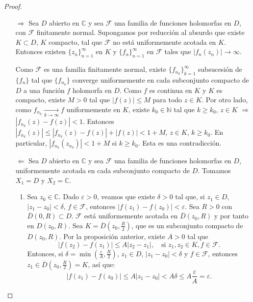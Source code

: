 \begin{proof}
    \hfill
    \begin{itemize}
        \item[$\boxed{\Rightarrow}$] Sea $D$ abierto en $\mathbb{C}$ y sea $\mathcal{F}$ una familia de funciones holomorfas en $D$, con $\mathcal{F}$ finitamente normal.
              Supongamos por reducción al absurdo que existe $K \subset D$, $K$ compacto, tal que $\mathcal{F}$ no está uniformemente acotada en $K$.
              Entonces existen $\{z_n\}_{n=1}^\infty$ en $K$ y $\{f_n\}_{n=1}^\infty$ en $\mathcal{F}$ tales que $|f_n(z_n)| \to \infty$.

              Como $\mathcal{F}$ es una familia finitamente normal, existe $\{f_{n_k}\}_{k=1}^\infty$ subsucesión de $\{f_n\}$ tal que $\{f_{n_k}\}$ converge uniformemente en cada subconjunto compacto de $D$ a una función $f$ holomorfa en $D$.
              Como $f$ es continua en $K$ y $K$ es compacto, existe $M > 0$ tal que $|f(z)| \leq M$ para todo $z \in K$.
              Por otro lado, como $f_{n_k} \xrightarrow[k \to \infty]{} f$ uniformemente en $K$, existe $k_0 \in \mathbb{N}$ tal que $k \geq k_0$, $z \in K$ $\Rightarrow$ $|f_{n_k}(z)-f(z)| < 1$.
              Entonces $|f_{n_k}(z)| \leq |f_{n_k}(z)-f(z)| + |f(z)| < 1 + M$, $z \in K$, $k \geq k_0$.
              En particular, $|f_{n_k}(z_{n_k})| < 1 + M$ si $k \geq k_0$.
              Esta es una contradicción.

        \item[$\boxed{\Leftarrow}$] Sea $D$ abierto en $\mathbb{C}$ y sea $\mathcal{F}$ una familia de funciones holomorfas en $D$, uniformemente acotada en cada subconjunto compacto de $D$.
              Tomamos $X_1 = D$ y $X_2 = \mathbb{C}$.

              \begin{enumerate}
                  \item Sea $z_0 \in \mathbb{C}$.
                        Dado $\varepsilon > 0$, veamos que existe $\delta > 0$ tal que, si $z_1 \in D$, $|z_1-z_0| < \delta$, $f \in \mathcal{F}$, entonces $|f(z_1) - f(z_0)| < \varepsilon$.
                        Sea $R > 0$ con $\overline{D}(0, R) \subset D$.
                        $\mathcal{F}$ está uniformemente acotada en $\overline{D}(z_0, R)$ y por tanto en $D(z_0, R)$.
                        Sea $K = \overline{D}(z_0, \frac{R}{2})$, que es un subconjunto compacto de $D(z_0, R)$.
                        Por la proposición anterior, existe $A > 0$ tal que
                        $$|f(z_2) - f(z_1)| \leq A|z_2-z_1|, \quad \text{si } z_1, z_2 \in K, f \in \mathcal{F}.$$
                        Entonces, si $\delta = \min \left(\frac{\varepsilon}{A}, \frac{R}{2}\right)$, $z_1 \in D$, $|z_1-z_0| < \delta$ y $f \in \mathcal{F}$, entonces $z_1 \in \overline{D}(z_0, \frac{R}{2}) = K$, así que:
                        $$|f(z_1) - f(z_0)| \leq A|z_1-z_0| < A\delta \leq A\frac{\varepsilon}{A} = \varepsilon.$$


\end{enumerate}
\end{itemize}
\end{proof}
